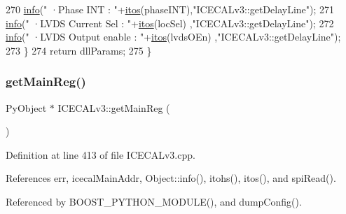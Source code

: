 \begin{DoxyCode}
270         \hyperlink{classObject_a644fd329ea4cb85f54fa6846484b84a8}{info}(\textcolor{stringliteral}{"   ·Phase INT          : "}+\hyperlink{Tools_8h_af330027dbdafb9a30768b3613c553e60}{itos}(phaseINT),\textcolor{stringliteral}{"ICECALv3::getDelayLine"});
271         \hyperlink{classObject_a644fd329ea4cb85f54fa6846484b84a8}{info}(\textcolor{stringliteral}{"   ·LVDS Current Sel   : "}+\hyperlink{Tools_8h_af330027dbdafb9a30768b3613c553e60}{itos}(locSel)  ,\textcolor{stringliteral}{"ICECALv3::getDelayLine"});
272         \hyperlink{classObject_a644fd329ea4cb85f54fa6846484b84a8}{info}(\textcolor{stringliteral}{"   ·LVDS Output enable : "}+\hyperlink{Tools_8h_af330027dbdafb9a30768b3613c553e60}{itos}(lvdsOEn) ,\textcolor{stringliteral}{"ICECALv3::getDelayLine"});
273     \}
274     \textcolor{keywordflow}{return} dllParams;
275 \}
\end{DoxyCode}
\mbox{\label{classICECALv3_a4a414d23c1e199b446dc876161338148}} 
\subsubsection{\texorpdfstring{get\+Main\+Reg()}{getMainReg()}}
{\footnotesize\ttfamily Py\+Object $\ast$ I\+C\+E\+C\+A\+Lv3\+::get\+Main\+Reg (\begin{DoxyParamCaption}{ }\end{DoxyParamCaption})}



Definition at line 413 of file I\+C\+E\+C\+A\+Lv3.\+cpp.



References err, icecal\+Main\+Addr, Object\+::info(), itohs(), itos(), and spi\+Read().



Referenced by B\+O\+O\+S\+T\+\_\+\+P\+Y\+T\+H\+O\+N\+\_\+\+M\+O\+D\+U\+L\+E(), and dump\+Config().


